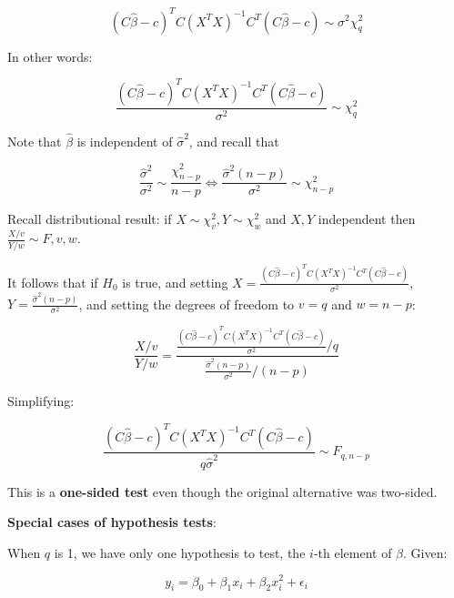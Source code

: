 \begin{equation}
(C\hat{\beta} - c)^T C (X^T X)^{-1} C^T (C\hat{\beta} - c) \sim \sigma^2 \chi_q^2
\end{equation}

In other words:

\begin{equation}
\frac{(C\hat{\beta} - c)^T C (X^T X)^{-1} C^T (C\hat{\beta} - c)}{ \sigma^2} \sim \chi_q^2
\end{equation}

Note that $\hat{\beta}$ is independent of $\hat{\sigma}^2$, and recall that

\begin{equation}
\frac{\hat{\sigma}^2 }{\sigma^2} \sim \frac{\chi_{n-p}^2}{n-p}  \Leftrightarrow 
\frac{\hat{\sigma}^2 (n-p)}{\sigma^2} \sim \chi_{n-p}^2
\end{equation} 

Recall distributional result: if $X\sim \chi_v^2, Y\sim \chi_w^2$ and $X,Y$ independent then $\frac{X/v}{Y/w}\sim F,v,w$.  


It follows that if $H_0$ is true,  and setting
$X=\frac{(C\hat{\beta} - c)^T C (X^T X)^{-1} C^T (C\hat{\beta} - c)}{ \sigma^2}$,
$Y=\frac{\hat{\sigma}^2 (n-p)}{\sigma^2}$, and setting the degrees of freedom to $v=q$ and $w=n-p$:

\begin{equation}
\frac{X/v}{Y/w}=
\frac{\frac{(C\hat{\beta} - c)^T C (X^T X)^{-1} C^T (C\hat{\beta} - c)}{ \sigma^2}/q}{\frac{\hat{\sigma}^2 (n-p)}{\sigma^2}/(n-p)}
\end{equation}

Simplifying:

\begin{equation}
\frac{(C\hat{\beta} - c)^T C (X^T X)^{-1} C^T (C\hat{\beta} - c)}{q\hat{\sigma}^2} \sim F_{q,n-p}
\end{equation}


This is a \textbf{one-sided test} even though the original alternative was two-sided.

\textbf{Special cases of hypothesis tests}:

When $q$ is 1, we have only one hypothesis to test, the $i$-th element of $\beta$. Given:

\begin{equation}
y_i = \beta_0 + \beta_1 x_i + \beta_2 x_i^2+\epsilon_i
\end{equation}

